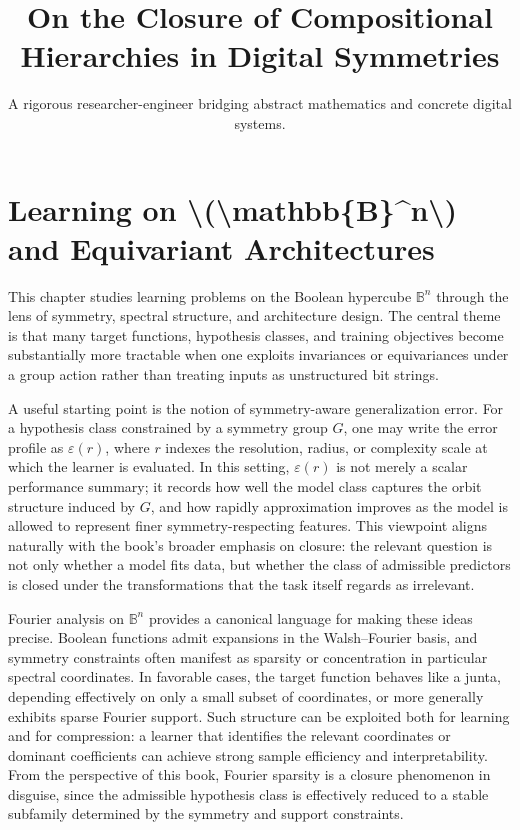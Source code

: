 \documentclass[11pt]{article}
\title{On the Closure of Compositional Hierarchies in Digital Symmetries}
\author{A rigorous researcher-engineer bridging abstract mathematics and concrete digital systems.}
\begin{document}
\section*{Learning on \textbackslash{}(\textbackslash{}mathbb\{B\}\textasciicircum{}n\textbackslash{}) and Equivariant Architectures}

This chapter studies learning problems on the Boolean hypercube \(\mathbb{B}^n\) through the lens of symmetry, spectral structure, and architecture design. The central theme is that many target functions, hypothesis classes, and training objectives become substantially more tractable when one exploits invariances or equivariances under a group action rather than treating inputs as unstructured bit strings.

A useful starting point is the notion of symmetry-aware generalization error. For a hypothesis class constrained by a symmetry group \(G\), one may write the error profile as \(\varepsilon(r)\), where \(r\) indexes the resolution, radius, or complexity scale at which the learner is evaluated. In this setting, \(\varepsilon(r)\) is not merely a scalar performance summary; it records how well the model class captures the orbit structure induced by \(G\), and how rapidly approximation improves as the model is allowed to represent finer symmetry-respecting features. This viewpoint aligns naturally with the book's broader emphasis on closure: the relevant question is not only whether a model fits data, but whether the class of admissible predictors is closed under the transformations that the task itself regards as irrelevant.

Fourier analysis on \(\mathbb{B}^n\) provides a canonical language for making these ideas precise. Boolean functions admit expansions in the Walsh--Fourier basis, and symmetry constraints often manifest as sparsity or concentration in particular spectral coordinates. In favorable cases, the target function behaves like a junta, depending effectively on only a small subset of coordinates, or more generally exhibits sparse Fourier support. Such structure can be exploited both for learning and for compression: a learner that identifies the relevant coordinates or dominant coefficients can achieve strong sample efficiency and interpretability. From the perspective of this book, Fourier sparsity is a closure phenomenon in disguise, since the admissible hypothesis class is effectively reduced to a stable subfamily determined by the symmetry and support constraints.
\end{document}
